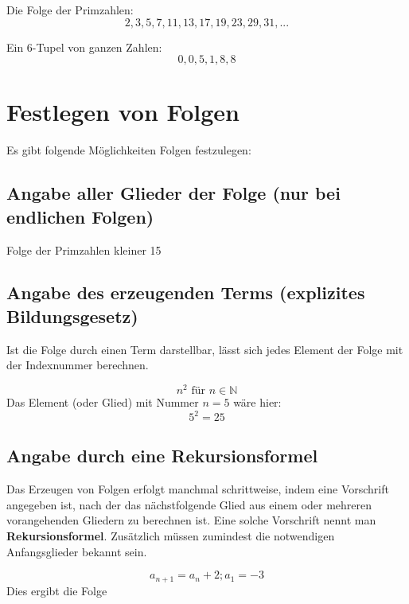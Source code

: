 \begin{example}
Die Folge der Primzahlen:
\[ 2,3,5,7,11,13,17,19,23,29,31,...\]
\end{example}

\begin{example}
Ein 6-Tupel von ganzen Zahlen:
\[ 0,0,5,1,8,8\]
\end{example}

\section{Festlegen von Folgen}
Es gibt folgende Möglichkeiten Folgen festzulegen:
\subsection{Angabe aller Glieder der Folge (nur bei endlichen Folgen)}

\begin{example}
Folge der Primzahlen kleiner 15
\begin{gelb}
\vspace{1.5cm} %
\end{gelb}
\end{example}


\subsection{Angabe des erzeugenden Terms (explizites Bildungsgesetz)}
Ist die Folge durch einen Term darstellbar, lässt sich jedes Element der Folge mit der Indexnummer berechnen.

\begin{example}
\[ n^{2} \text{ für } n \in \mathbb{N} \]
Das Element (oder Glied) mit Nummer $n=5$ wäre hier:
\[ 5^{2} = 25 \]
\end{example}

\subsection{Angabe durch eine Rekursionsformel}
Das Erzeugen von Folgen erfolgt manchmal schrittweise, indem eine Vorschrift angegeben ist, nach der das
nächstfolgende Glied aus einem oder mehreren vorangehenden Gliedern zu berechnen ist. Eine solche
Vorschrift nennt man \textbf{Rekursions\-formel}. Zusätzlich müssen zumindest die notwendigen Anfangsglieder
bekannt sein.

\begin{example}
\[ a_{n+1} = a_{n} + 2 ; a_{1} = -3 \]
Dies ergibt die Folge
\begin{gelb}
\vspace{1.5cm}
\end{gelb}
\end{example}

